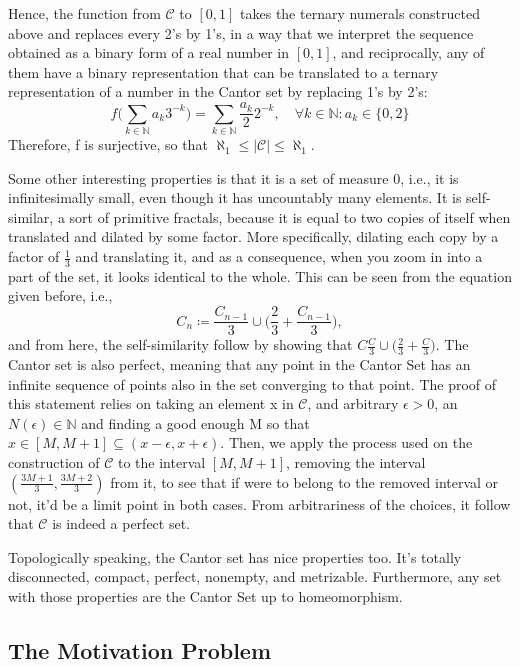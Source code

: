 \documentclass{article}
\begin{document}
Hence, the function from $\mathcal{C}$ to $[0, 1]$ takes the ternary numerals constructed above and replaces every 2's by 1's, in a way
that we interpret the sequence obtained as a binary form of a real number in $[0, 1]$, and reciprocally, any of them have a binary 
representation that can be translated to a ternary representation of a number in the Cantor set by replacing 1's by 2's: 
  $$
  f\biggl(\sum\limits_{k\in \mathbb{N}}^{}a_{k}3^{-k}\biggr) = \sum\limits_{k\in \mathbb{N}}^{}\frac{a_{k}}{2}2^{-k},\quad \forall k\in \mathbb{N}: a_{k}\in \{0, 2\}
  $$
  Therefore, f is surjective, so that $\aleph_{1} \leq{|\mathcal{C}|} \leq{\aleph_{1}.}$

  Some other interesting properties is that it is a set of measure 0, i.e., it is infinitesimally small, even though it has uncountably many
elements. It is self-similar, a sort of primitive fractals, because it is equal to two copies of itself when translated and dilated by some factor. 
More specifically, dilating each copy by a factor of $\frac{1}{3}$ and translating it, and as a consequence, when you zoom in into a 
part of the set, it looks identical to the whole. This can be seen from the equation given before, i.e., 
  $$
    C_{n}\coloneqq\displaystyle \frac{C_{n-1}}{3}\cup\biggl(\frac{2}{3}+\frac{C_{n-1}}{3}\biggr),
  $$
  and from here, the self-similarity follow by showing that $C\displaystyle \frac{C}{3}\cup\biggl(\frac{2}{3}+\frac{C}{3}\biggr)$.
The Cantor set is also perfect, meaning that any point in the Cantor Set has an infinite sequence of points also in the set converging to that point.
The proof of this statement relies on taking an element x in $\mathcal{C}$, and arbitrary $\epsilon > 0$, an $N(\epsilon)\in \mathbb{N}$ and finding a good enough M 
so that $x\in[M, M+1]\subseteq{(x-\epsilon, x+\epsilon)}$. Then, we apply the process used on the construction of $\mathcal{C}$ to
the interval $[M, M+1]$, removing the interval $(\frac{3M+1}{3}, \frac{3M+2}{3})$ from it, to see that if were to belong to the removed 
interval or not, it'd be a limit point in both cases. From arbitrariness of the choices, it follow that $\mathcal{C}$ is indeed a perfect set.

  Topologically speaking, the Cantor set has nice properties too. It's totally disconnected, compact, perfect, nonempty, and metrizable.
Furthermore, any set with those properties are the Cantor Set up to homeomorphism.
\subsection{The Motivation Problem}
\end{document}
